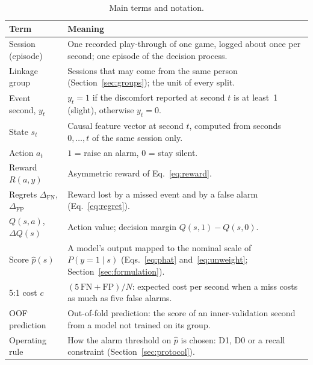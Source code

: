 \begin{table}[t]
\centering
\caption{Main terms and notation.}
\label{tab:notation}
\footnotesize
\begin{tabular}{@{}p{}p{}@{}}
\toprule
Term & Meaning \\
\midrule
Session (episode) & One recorded play-through of one game, logged about once per second; one episode of the decision process. \\
Linkage group & Sessions that may come from the same person (Section~\ref{sec:groups}); the unit of every split. \\
Event second, $y_t$ & $y_t=1$ if the discomfort reported at second $t$ is at least~1 (slight), otherwise $y_t=0$. \\
State $s_t$ & Causal feature vector at second $t$, computed from seconds $0,\dots,t$ of the same session only. \\
Action $a_t$ & $1$ = raise an alarm, $0$ = stay silent. \\
Reward $R(a,y)$ & Asymmetric reward of Eq.~\eqref{eq:reward}. \\
Regrets $\Delta_{\mathrm{FN}}$, $\Delta_{\mathrm{FP}}$ & Reward lost by a missed event and by a false alarm (Eq.~\eqref{eq:regret}). \\
$Q(s,a)$, $\Delta Q(s)$ & Action value; decision margin $Q(s,1)-Q(s,0)$. \\
Score $\hat p(s)$ & A model's output mapped to the nominal scale of $P(y=1\mid s)$ (Eqs.~\eqref{eq:phat} and~\eqref{eq:unweight}; Section~\ref{sec:formulation}). \\
5:1 cost $c$ & $(5\,\mathrm{FN}+\mathrm{FP})/N$: expected cost per second when a miss costs as much as five false alarms. \\
OOF prediction & Out-of-fold prediction: the score of an inner-validation second from a model not trained on its group. \\
Operating rule & How the alarm threshold on $\hat p$ is chosen: D1, D0 or a recall constraint (Section~\ref{sec:protocol}). \\
\bottomrule
\end{tabular}
\end{table}

